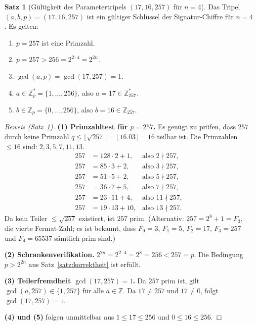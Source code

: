 ﻿\documentclass[a4paper,12pt]{scrreprt}
\theoremstyle{definition}
\newtheorem{satz}{Satz}[section]
\begin{document}
\begin{satz}[Gültigkeit des Parametertripels $(17, 16, 257)$ für $n=4$]
\label{satz:param1716257}
Das Tripel $(a, b, p) = (17, 16, 257)$ ist ein gültiger Schlüssel der Signatur-Chiffre für $n = 4$. Es gelten:
\begin{enumerate}
  \item $p = 257$ ist eine Primzahl.
  \item $p = 257 > 256 = 2^{2 \cdot 4} = 2^{2n}$.
  \item $\gcd(a, p) = \gcd(17, 257) = 1$.
  \item $a \in \mathbb{Z}_p^* = \{1, \ldots, 256\}$, also $a = 17 \in \mathbb{Z}_{257}^*$.
  \item $b \in \mathbb{Z}_p = \{0, \ldots, 256\}$, also $b = 16 \in \mathbb{Z}_{257}$.
\end{enumerate}
\end{satz}

\begin{proof}[Beweis (Satz~\ref{satz:param1716257})]
\textbf{(1) Primzahltest für $p = 257$.}
Es genügt zu prüfen, dass $257$ durch keine Primzahl $q \leq \lfloor \sqrt{257} \rfloor = \lfloor 16.03 \rfloor = 16$ teilbar ist. Die Primzahlen $\leq 16$ sind: $2, 3, 5, 7, 11, 13$.
\begin{align*}
257 &= 128 \cdot 2 + 1, & \text{also } 2 \nmid 257, \\
257 &= 85 \cdot 3 + 2, & \text{also } 3 \nmid 257, \\
257 &= 51 \cdot 5 + 2, & \text{also } 5 \nmid 257, \\
257 &= 36 \cdot 7 + 5, & \text{also } 7 \nmid 257, \\
257 &= 23 \cdot 11 + 4, & \text{also } 11 \nmid 257, \\
257 &= 19 \cdot 13 + 10, & \text{also } 13 \nmid 257.
\end{align*}
Da kein Teiler $\leq \sqrt{257}$ existiert, ist $257$ prim. (Alternativ: $257 = 2^8 + 1 = F_3$, die vierte Fermat-Zahl; es ist bekannt, dass $F_0=3$, $F_1=5$, $F_2=17$, $F_3=257$ und $F_4=65537$ sämtlich prim sind.)

\textbf{(2) Schrankenverifikation.}
$2^{2n} = 2^{2 \cdot 4} = 2^8 = 256 < 257 = p$. Die Bedingung $p > 2^{2n}$ aus Satz~\ref{satz:korrektheit} ist erfüllt.

\textbf{(3) Teilerfremdheit $\gcd(17, 257) = 1$.}
Da $257$ prim ist, gilt $\gcd(a, 257) \in \{1, 257\}$ für alle $a \in \mathbb{Z}$. Da $17 \neq 257$ und $17 \neq 0$, folgt $\gcd(17, 257) = 1$.

\textbf{(4) und (5)} folgen unmittelbar aus $1 \leq 17 \leq 256$ und $0 \leq 16 \leq 256$.
\end{proof}
\end{document}
